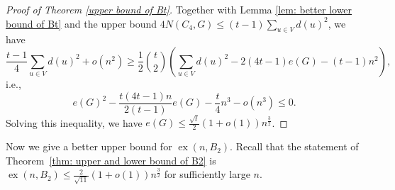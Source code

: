 \documentclass[11pt,a4paper]{article}
\theoremstyle{definition}
\DeclareMathOperator{\ex}{ex}
\begin{document}
\begin{proof}[Proof of Theorem \ref{upper bound of Bt}]
            

        Together with Lemma \ref{lem: better lower bound of Bt} and the upper bound $4N(C_4, G) \leq (t-1) \sum_{u \in V} d(u)^2$, we have
        \begin{equation*}
            \frac{t-1}{4} \sum_{u \in V} d(u)^2 + o(n^2) \geq \frac{1}{2} \binom{t}{2} \left(\sum_{u \in V} d(u)^2 - 2(4t-1) e(G) - (t-1) n^2 \right),
        \end{equation*}
        i.e.,
        \begin{equation*}
            e(G)^2 - \frac{t(4t-1)n}{2(t-1)}e(G) - \frac{t}{4} n^3 - o(n^3) \leq 0.
        \end{equation*}
        Solving this inequality, we have $e(G) \leq \frac{\sqrt{t}}{2} (1+o(1)) n^{\frac{3}{2}}$.
        \end{proof}

        Now we give a better upper bound for $\ex(n, B_2)$.
        Recall that the statement of Theorem~\ref{thm: upper and lower bound of B2} is $\ex(n,B_2) \leq \frac{2}{\sqrt{11}} (1+o(1)) n^{\frac{3}{2}}$ for sufficiently large $n$.
\end{document}
